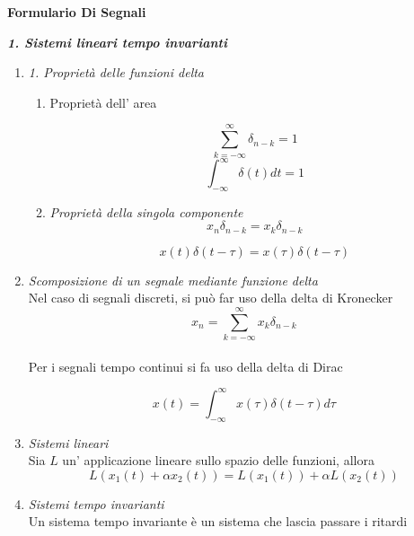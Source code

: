\documentclass[]{article}
\begin{document}
\begin{center}
\begin{Large}
\textbf{Formulario Di Segnali}
\end{Large}
\end{center}



\textit{\textbf{ 1. Sistemi lineari tempo invarianti}}
\begin{enumerate}
\item \textit{1. Proprietà delle funzioni delta}
\\
\begin{enumerate}
\item
Proprietà dell' area

\[ \sum_{k=-\infty}^{\infty} \delta_{n-k} =1 \]
\begin{equation}
\int_{- \infty}^{\infty} \delta(t) dt =1
\end{equation}
\item \textit{Proprietà della singola componente}
\[ x_n \delta_{n-k}= x_k \delta_{n-k} \]

\begin{equation}
x(t) \delta(t- \tau)= x(\tau) \delta(t- \tau)
\end{equation}

\end{enumerate}


\item \textit{Scomposizione di un segnale mediante funzione delta}
\\
Nel caso di segnali discreti, si può far uso della delta di Kronecker
\begin{equation}
x_n = \sum_{k=-\infty}^{\infty} x_k \delta_{n-k}
\end{equation}
\\
Per i segnali tempo continui  si fa uso della delta di Dirac

\begin{equation}
x(t) = \int_{- \infty}^{\infty} x( \tau) \delta(t- \tau) d \tau
\end{equation}

\item \textit{Sistemi lineari }
\\
Sia $L$ un' applicazione lineare sullo spazio delle funzioni, allora 
\begin{equation}
L(x_1(t) + \alpha x_2(t))=  L(x_1(t)) + \alpha L(x_2(t))
\end{equation}

\item \textit{Sistemi tempo invarianti}
\\
Un sistema tempo invariante è un sistema che lascia passare i ritardi


\end{enumerate}
\end{document}
